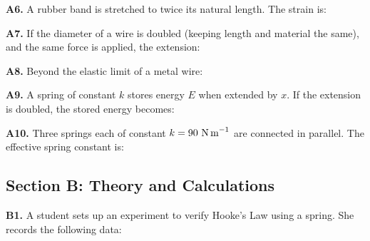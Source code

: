 \begin{exercisebox}[9]
\vspace{0.4cm}

\textbf{A6.} A rubber band is stretched to twice its
natural length. The strain is:


\vspace{0.4cm}

\textbf{A7.} If the diameter of a wire is doubled
(keeping length and material the same), and the same
force is applied, the extension:


\vspace{0.4cm}

\textbf{A8.} Beyond the elastic limit of a metal wire:


\vspace{0.4cm}

\textbf{A9.} A spring of constant $k$ stores energy
$E$ when extended by $x$. If the extension is doubled,
the stored energy becomes:


\vspace{0.4cm}

\textbf{A10.} Three springs each of constant
$k = 90\ \text{N\,m}^{-1}$ are connected in parallel.
The effective spring constant is:


\vspace{0.6cm}

\subsection*{Section B: Theory and Calculations}

\textbf{B1.} A student sets up an experiment to
verify Hooke's Law using a spring. She records the
following data:


\end{exercisebox}
